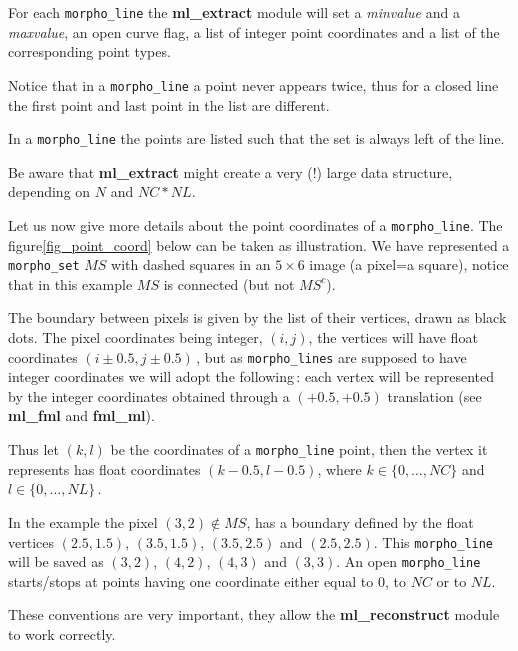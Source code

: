 For each {\tt morpho\_line} the {\bf ml\_extract} module will set
a {\em minvalue} and a {\em maxvalue}, an open curve flag, 
a list of integer point coordinates and a list 
of the corresponding point types.

\smallskip

Notice that in a {\tt morpho\_line} a point never appears twice, 
thus for a closed line the first point and last point 
in the list are different.

\smallskip

In a {\tt morpho\_line} the points are listed such that 
the set is always left of the line. 

\smallskip

Be aware that {\bf ml\_extract} might create a very (!) large
data structure, depending on $N$ and  $NC*NL$.

\bigskip

Let us now give more details about the point coordinates of a
{\tt morpho\_line}. The figure\ref{fig_point_coord} below
 can be taken as illustration.
We have represented a {\tt morpho\_set} $MS$ with dashed squares
in an $5\times 6$ image (a pixel=a square), 
notice that in this example $MS$ is connected
(but not $MS^c$).

\medskip

The boundary between pixels is given by the list of their vertices,
drawn as black dots. The pixel coordinates being integer, $(i,j)$, the
vertices will have float coordinates $(i\pm 0.5 , j\pm 0.5)$\,,
but as {\tt morpho\_lines} are supposed to have integer coordinates
we will adopt the following\,: each vertex will be represented
by the integer coordinates obtained through a $(+0.5,+0.5)$
translation (see {\bf ml\_fml} and {\bf fml\_ml}).

\smallskip

Thus let $(k,l)$ be the coordinates  of a {\tt morpho\_line} point,
then the vertex it represents has float coordinates 
$(k-0.5 , l-0.5)$, where $k\in\{0,\ldots,NC\}$ and 
$l\in\{0,\ldots,NL\}$\,.

\smallskip

In the example the pixel $(3,2)\not\in MS$, has a boundary
defined by the float vertices $(2.5,1.5)$, $(3.5,1.5)$, 
$(3.5,2.5)$ and $(2.5,2.5)$. This {\tt morpho\_line}
will be saved as $(3,2)$, $(4,2)$, $(4,3)$ and $(3,3)$.
An open {\tt morpho\_line} starts/stops at points
having one coordinate either equal to 0, to $NC$ or to $NL$.

\medskip
These conventions are very important, they allow the
{\bf ml\_reconstruct} module to work correctly.

